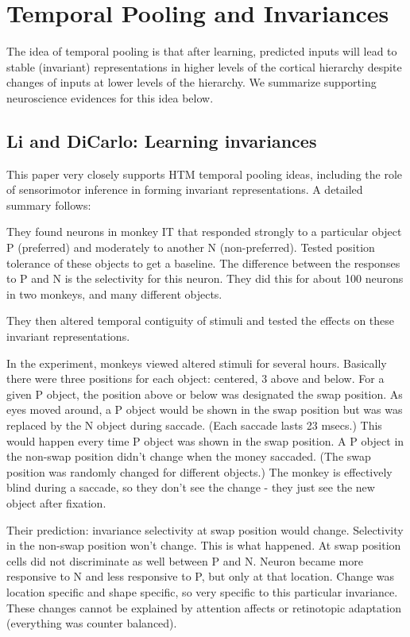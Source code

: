 \documentclass{article} %
\begin{document}
\section{Temporal Pooling and Invariances}

The idea of temporal pooling is that after learning, predicted inputs will
lead to stable (invariant) representations in higher levels of the cortical
hierarchy despite changes of inputs at lower levels of the hierarchy. We
summarize supporting neuroscience evidences for this idea below.

\subsection{Li and DiCarlo: Learning invariances}

This paper \cite{Li2008} very closely supports HTM temporal pooling ideas,
including the role of sensorimotor inference in forming invariant
representations.  A detailed summary follows:

They found neurons in monkey IT that responded strongly to a particular object
P (preferred) and moderately to another N (non-preferred). Tested position
tolerance of these objects to get a baseline.  The difference between the
responses to P and N is the selectivity for this neuron.  They did this
for about 100 neurons in two monkeys, and many different objects.

They then altered temporal contiguity of stimuli and tested the effects on these
invariant representations.



In the experiment, monkeys viewed altered stimuli for several hours. Basically
there were three positions for each object: centered, 3 above and below. For a
given P object, the position above or below was designated the swap position.
As eyes moved around, a P object would be shown in the swap position but was was
replaced by the N object during saccade. (Each saccade lasts 23 msecs.) This
would happen every time P object was shown in the swap position.  A P object in
the non-swap position didn't change when the money saccaded. (The swap position
was randomly changed for different objects.)  The monkey is effectively blind
during a saccade, so they don't see the change - they just see the new object
after fixation.

Their prediction: invariance selectivity at swap position would change.
Selectivity in the non-swap position won't change.  This is what happened. At
swap position cells did not discriminate as well between P and N. Neuron became
more responsive to N and less responsive to P, but only at that location. Change
was location specific and shape specific, so very specific to this particular
invariance. These changes cannot be explained by attention affects or
retinotopic adaptation (everything was counter balanced).
\end{document}
